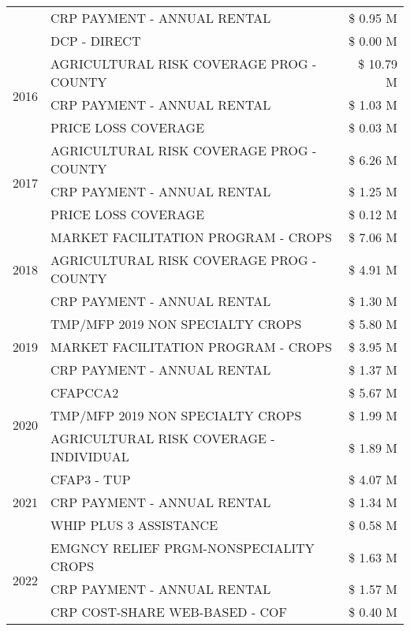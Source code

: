 \begin{tabular}{llr}
 & CRP PAYMENT - ANNUAL RENTAL & \$ 0.95 M \\
 & DCP - DIRECT & \$ 0.00 M \\
\cline{1-3}
\multirow[t]{3}{*}{2016} & AGRICULTURAL RISK COVERAGE PROG - COUNTY & \$ 10.79 M \\
 & CRP PAYMENT - ANNUAL RENTAL & \$ 1.03 M \\
 & PRICE LOSS COVERAGE & \$ 0.03 M \\
\cline{1-3}
\multirow[t]{3}{*}{2017} & AGRICULTURAL RISK COVERAGE PROG - COUNTY & \$ 6.26 M \\
 & CRP PAYMENT - ANNUAL RENTAL & \$ 1.25 M \\
 & PRICE LOSS COVERAGE & \$ 0.12 M \\
\cline{1-3}
\multirow[t]{3}{*}{2018} & MARKET FACILITATION PROGRAM - CROPS & \$ 7.06 M \\
 & AGRICULTURAL RISK COVERAGE PROG - COUNTY & \$ 4.91 M \\
 & CRP PAYMENT - ANNUAL RENTAL & \$ 1.30 M \\
\cline{1-3}
\multirow[t]{3}{*}{2019} & TMP/MFP 2019 NON SPECIALTY CROPS & \$ 5.80 M \\
 & MARKET FACILITATION PROGRAM - CROPS & \$ 3.95 M \\
 & CRP PAYMENT - ANNUAL RENTAL & \$ 1.37 M \\
\cline{1-3}
\multirow[t]{3}{*}{2020} & CFAPCCA2 & \$ 5.67 M \\
 & TMP/MFP 2019 NON SPECIALTY CROPS & \$ 1.99 M \\
 & AGRICULTURAL RISK COVERAGE - INDIVIDUAL & \$ 1.89 M \\
\cline{1-3}
\multirow[t]{3}{*}{2021} & CFAP3 - TUP & \$ 4.07 M \\
 & CRP PAYMENT - ANNUAL RENTAL & \$ 1.34 M \\
 & WHIP PLUS 3 ASSISTANCE & \$ 0.58 M \\
\cline{1-3}
\multirow[t]{3}{*}{2022} & EMGNCY RELIEF PRGM-NONSPECIALITY CROPS & \$ 1.63 M \\
 & CRP PAYMENT - ANNUAL RENTAL & \$ 1.57 M \\
 & CRP COST-SHARE WEB-BASED - COF & \$ 0.40 M \\
\cline{1-3}
\bottomrule
\end{tabular}
